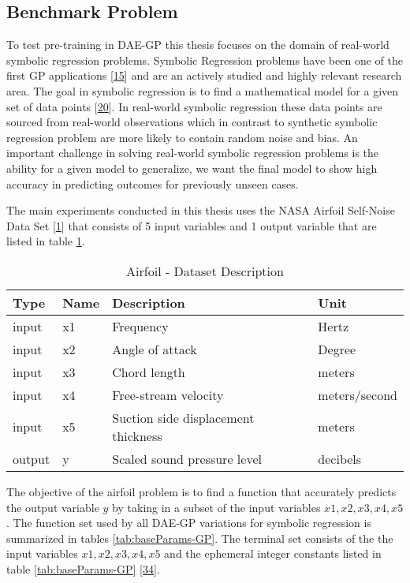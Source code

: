 \documentclass[
  11pt,
]{article}
\begin{document}
\hypertarget{benchmark-problem}{%
\subsection{Benchmark Problem}\label{benchmark-problem}}

To test pre-training in DAE-GP this thesis focuses on the domain of real-world symbolic regression problems.
Symbolic Regression problems have been one of the first GP applications {[}\protect\hyperlink{ref-Koza1993GeneticP}{15}{]} and are an actively studied and highly relevant research area.
The goal in symbolic regression is to find a mathematical model for a given set of data points {[}\protect\hyperlink{ref-10.1007ux2f978-3-540-24621-3_22}{20}{]}.
In real-world symbolic regression these data points are sourced from real-world observations which in contrast to synthetic symbolic regression problem are more likely to contain random noise and bias.
An important challenge in solving real-world symbolic regression problems is the ability for a given model to generalize, we want the final model to show high accuracy in predicting outcomes for previously unseen cases.

The main experiments conducted in this thesis uses the NASA Airfoil Self-Noise Data Set {[}\protect\hyperlink{ref-AIRFOIL_DATASET}{1}{]} that consists of 5 input variables and 1 output variable that are listed in table \ref{tab:airfoil-dataset-description}.

\begin{table}[!h]

\caption{\label{tab:airfoil-dataset-description}Airfoil - Dataset Description}
\centering
\begin{tabular}[t]{l|l|l|l}
\hline
\textbf{Type} & \textbf{Name} & \textbf{Description} & \textbf{Unit}\\
\hline
input & x1 & Frequency & Hertz\\
\hline
input & x2 & Angle of attack & Degree\\
\hline
input & x3 & Chord length & meters\\
\hline
input & x4 & Free-stream velocity & meters/second\\
\hline
input & x5 & Suction side displacement thickness & meters\\
\hline
output & y & Scaled sound pressure level & decibels\\
\hline
\end{tabular}
\end{table}

The objective of the airfoil problem is to find a function that accurately predicts the output variable \(y\) by taking in a subset of the input variables \(x1,x2,x3,x4,x5\).
The function set used by all DAE-GP variations for symbolic regression is summarized in tables \ref{tab:baseParams-GP}.
The terminal set consists of the the input variables \(x1,x2,x3,x4,x5\) and the ephemeral integer constants listed in table \ref{tab:baseParams-GP} {[}\protect\hyperlink{ref-dae-gp_2022_symreg}{34}{]}.
\end{document}
